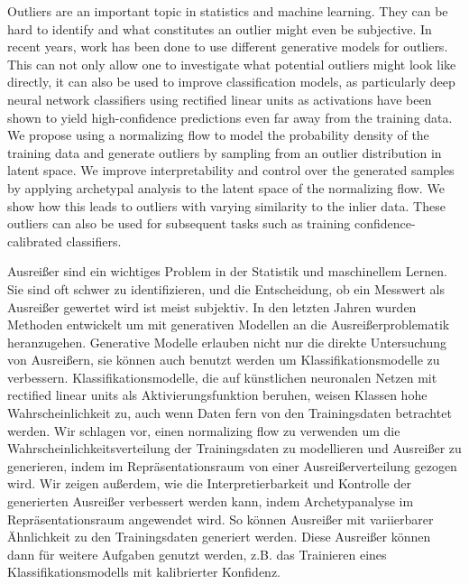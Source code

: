 \documentclass[12pt]{report}
\newenvironment{abstractpage}
    {\cleardoublepage\vspace*{\fill}\thispagestyle{empty}}
    {\vfill\cleardoublepage}
\renewenvironment{abstract}[1]
    {\bigskip\selectlanguage{#1}
    \begin{center}\bfseries\abstractname\end{center}}
    {\par\bigskip}
\begin{document}
\onehalfspacing

\thispagestyle{empty}
\pagestyle{blank}



\begin{abstractpage}
    \begin{abstract}{english}
        Outliers are an important topic in statistics and machine learning.
        They can be hard to identify and what constitutes an outlier might even
        be subjective. In recent years, work has been done to use different
        generative models for outliers. This can not only allow one to
        investigate what potential outliers might look like directly, it can
        also be used to improve classification models, as particularly deep
        neural network classifiers using rectified linear units as activations
        have been shown to yield high-confidence predictions even far away from
        the training data. We propose using a normalizing flow to model the
        probability density of the training data and generate outliers by
        sampling from an outlier distribution in latent space. We improve
        interpretability and control over the generated samples by applying
        archetypal analysis to the latent space of the normalizing flow. We
        show how this leads to outliers with varying similarity to the inlier
        data. These outliers can also be used for subsequent tasks such as
        training confidence-calibrated classifiers.
    \end{abstract}
    \begin{abstract}{ngerman}
        Ausrei{\ss}er sind ein wichtiges Problem in der Statistik und maschinellem
        Lernen. Sie sind oft schwer zu identifizieren, und die Entscheidung, ob
        ein Messwert als Ausrei{\ss}er gewertet wird ist meist subjektiv. In den
        letzten Jahren wurden Methoden entwickelt um mit generativen Modellen
        an die Ausrei{\ss}erproblematik heranzugehen. Generative Modelle erlauben
        nicht nur die direkte Untersuchung von Ausrei{\ss}ern, sie können auch
        benutzt werden um Klassifikationsmodelle zu verbessern.
        Klassifikationsmodelle, die auf künstlichen neuronalen Netzen mit
        rectified linear units als Aktivierungsfunktion beruhen, weisen Klassen
        hohe Wahrscheinlichkeit zu, auch wenn Daten fern von den Trainingsdaten
        betrachtet werden. Wir schlagen vor, einen normalizing flow zu
        verwenden um die Wahrscheinlichkeitsverteilung der Trainingsdaten zu
        modellieren und Ausrei{\ss}er zu generieren, indem im Repräsentationsraum
        von einer Ausrei{\ss}erverteilung gezogen wird. Wir zeigen au{\ss}erdem, wie
        die Interpretierbarkeit und Kontrolle der generierten Ausrei{\ss}er
        verbessert werden kann, indem Archetypanalyse im Repräsentationsraum
        angewendet wird. So können Ausrei{\ss}er mit variierbarer Ähnlichkeit zu
        den Trainingsdaten generiert werden. Diese Ausrei{\ss}er können dann für
        weitere Aufgaben genutzt werden, z.B. das Trainieren eines
        Klassifikationsmodells mit kalibrierter Konfidenz.
    \end{abstract}
\end{abstractpage}
\end{document}
